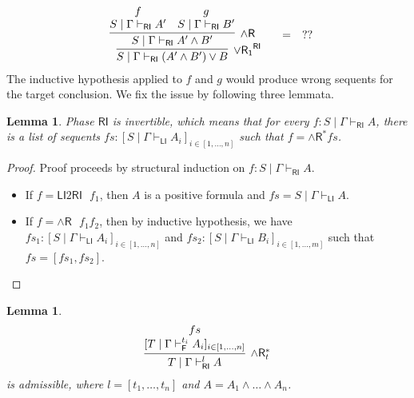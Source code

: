 \documentclass[submission,copyright,creativecommons]{eptcs}
\newtheorem{lemma}[theorem]{Lemma}
\theoremstyle{definition}
\newcommand{\andr}{\land \mathsf{R}}
\newcommand{\orrone}{\lor \mathsf{R_{1}}}
\newcommand{\RI}{\mathsf{RI}}
\newcommand{\LI}{\mathsf{LI}}
\newcommand{\F}{\mathsf{F}}
\newcommand{\proofbox}[1]{\begin{tabular}{l} #1 \end{tabular}}
\begin{document}
\begin{displaymath}
  \begin{array}{c}
    \proofbox{
    \infer[\orrone^{\RI}]{S \mid \Gamma \vdash_{\RI} (A' \land B') \lor B}{
      \infer[\andr]{S \mid \Gamma \vdash_{\RI} A' \land B'}{
        \deduce{S \mid \Gamma \vdash_{\RI} A'}{f}
        &
        \deduce{S \mid \Gamma \vdash_{\RI} B'}{g}
      }
    }
    }
    \quad
    =
    \quad
    ??
  \end{array}
\end{displaymath}
The inductive hypothesis applied to $f$ and $g$ would produce wrong sequents for the target conclusion.
We fix the issue by following three lemmata.
\begin{lemma}
  Phase $\RI$ is invertible, which means that for every $f : S \mid \Gamma \vdash_{\RI} A$, there is a list of sequents $fs : [S \mid \Gamma \vdash_{\LI} A_i]_{i \in [1 , \dots , n]}$ such that $f = \andr^{*} fs$.
\end{lemma}
\begin{proof}
  Proof proceeds by structural induction on $f : S \mid \Gamma \vdash_{\RI} A$.
  \begin{itemize}
    \item If $f = \LI2 \RI \text{ } f_1$, then $A$ is a positive formula and $fs = S \mid \Gamma \vdash_{\LI} A$.
    \item If $f = \andr \text{ } f_1 f_2$, then by inductive hypothesis, we have $fs_1 : [S \mid \Gamma \vdash_{\LI} A_i]_{i \in [1 , \dots , n]}$ and $fs_2 : [S \mid \Gamma \vdash_{\LI} B_i]_{i \in [1 , \dots , m]}$ such that $fs = [fs_1 , fs_2]$.
  \end{itemize}
\end{proof}
\begin{lemma}
  \begin{displaymath}
    \infer[\andr^{*}_t]{T \mid \Gamma \vdash^{l}_{\RI} A}{
      \deduce{[T \mid \Gamma \vdash^{t_i}_{\F} A_i]_{i \in [1 , \dots , n]}}{fs}
    }
  \end{displaymath}
  is admissible, where $l = [t_1 , \dots , t_n]$ and $A = A_1 \land \dots \land A_n$.
\end{lemma}
\end{document}

